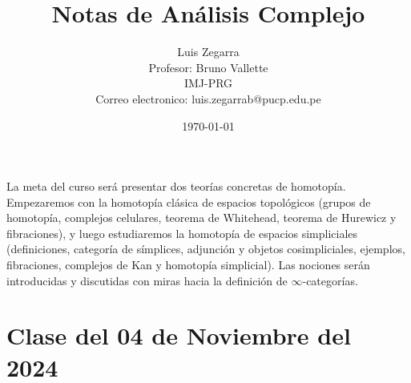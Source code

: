 \documentclass[11pt]{article}
\title{Notas de Análisis Complejo}
\author{Luis Zegarra \\ Profesor: Bruno Vallette \\ IMJ-PRG \\ Correo electronico: luis.zegarrab@pucp.edu.pe}
\date{\today}
\begin{document}
 

\maketitle

La meta del curso será presentar dos teorías concretas de homotopía. Empezaremos con la homotopía clásica de espacios topológicos (grupos de homotopía, complejos celulares, teorema de Whitehead, teorema de Hurewicz y fibraciones), y luego estudiaremos la homotopía de espacios simpliciales (definiciones, categoría de símplices, adjunción y objetos cosimpliciales, ejemplos, fibraciones, complejos de Kan y homotopía simplicial). Las nociones serán introducidas y discutidas con miras hacia la definición de $\infty$-categorías.

\tableofcontents

\newpage

\section{Clase del 04 de Noviembre del 2024}


\end{document}
